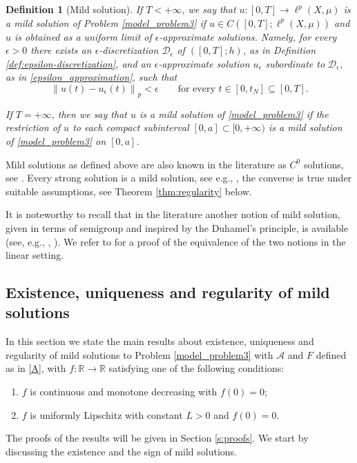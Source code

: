 \documentclass[journal]{article}
\theoremstyle{nonitalic}
\theoremstyle{nonitalic}
\theoremstyle{plain} %
\newtheorem{definition}[theorem]{Definition}
\numberwithin{equation}{section}
\newcommand{\R}{\mathbb{R}}
\begin{document}
\begin{definition}[Mild solution]\label{def:weak_solution}
If $T<+\infty$, we say that $u \colon [0,T]\to \ell^p\left(X,\mu\right)$    is a \emph{mild solution} of Problem \eqref{model_problem3} if $u \in C\left( [0,T]; \ell^p\left(X,\mu\right)\right)$ and $u$ is obtained as a uniform limit of $\epsilon$-approximate solutions. Namely, for every $\epsilon>0$ there exists an $\epsilon$-discretization  $\mathcal{D}_\epsilon$ of $([0,T]; h)$, as in Definition \ref{def:epsilon-discretization}, and an $\epsilon$-approximate solution $u_\epsilon$  subordinate to $\mathcal{D}_\epsilon$, as in \eqref{epsilon_approximation}, such that
	\begin{equation*}
	\left\|u(t) - u_\epsilon(t) \right\|_p < \epsilon \qquad \mbox{for every } t\in [0,t_N]\subseteq [0,T].
	\end{equation*}
	
If $T = +\infty$, then  we say that $u$ is a mild solution of \eqref{model_problem3} if the restriction of $u$ to each compact subinterval $[0,a]\subset [0,+\infty)$ is a mild solution of \eqref{model_problem3} on $[0,a]$.
\end{definition}

Mild solutions as defined above are also known in the literature as $C^0$ solutions, see \cite[Chapter IV.8]{showalter2013monotone}. Every strong solution is a mild solution, see e.g., \cite[Chapter 4]{barbu2010nonlinear}, the converse is true under suitable assumptions, see Theorem \ref{thm:regularity} below. 


\par


 
 
 It is noteworthy to recall that in the literature another notion of mild solution, given in terms of semigroup and inspired by the Duhamel's principle, is available (see, e.g., \cite[Definition 2.3, Chapter 4]{pazy}, \cite[Definition 3.1]{grillo2024blow}). We refer to \cite[Theorem 5.7]{benilan1988evolution} for a proof of the equivalence of the two notions in the linear setting.







\subsection{Existence, uniqueness and regularity of mild solutions}
In this section we state the main results about existence, uniqueness and regularity of mild solutions to Problem \eqref{model_problem3} with $\mathcal{A}$ and $F$ defined as in \eqref{A}, with $f: \R \rightarrow \R$ satisfying one of the following conditions:
\begin{enumerate}
	 \item[\textbf{\textnormal{\ref{F1:monotonicity}}}] $f$ is continuous and  monotone decreasing with $f(0)=0$;
	 \item[\textbf{\textnormal{\ref{F2:Lipschitz}}}] $f$ is uniformly Lipschitz with constant $L>0$ and $f(0)=0$.
	 \end{enumerate} 
The proofs of the results will be given in Section \ref{s:proofs}. We start by discussing the existence and the sign of mild solutions.
\end{document}
